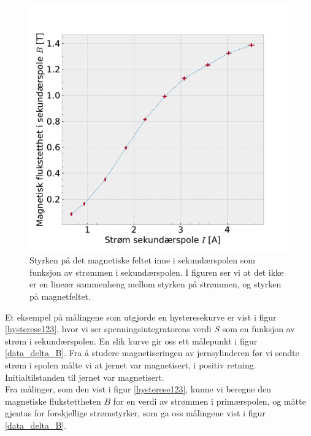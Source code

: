 \documentclass[%
 reprint,
 amsmath,amssymb,
 aps,
 norsk,
]{revtex4-1}
\begin{document}
\begin{figure}[h!]
  \centering
  \includegraphics[scale=0.45]{magnetic_secondary_hysterese.pdf}
  \caption{Styrken på det magnetiske feltet inne i sekundærspolen som funksjon av strømmen i sekundærspolen. I figuren ser vi at det ikke er en lineær sammenheng mellom styrken på strømmen, og styrken på magnetfeltet.}
  \label{data_delta_B}
\end{figure}
Et eksempel på målingene som utgjorde en hysteresekurve er vist i figur \vref{hysterese123}, hvor vi ser spenningsintegratorens verdi $S$ som en funksjon av strøm i sekundærspolen. En slik kurve gir oss ett målepunkt i figur \vref{data_delta_B}. Fra å studere magnetiseringen av jernsylinderen før vi sendte strøm i spolen målte vi at jernet var magnetisert, i positiv retning. Initialtilstanden til jernet var magnetisert. \\ Fra målinger, som den vist i figur \vref{hysterese123}, kunne vi beregne den magnetiske flukstettheten $B$ for en verdi av strømmen i primærspolen, og måtte gjentas for forskjellige strømstyrker, som ga oss målingene vist i figur \vref{data_delta_B}.
\end{document}
